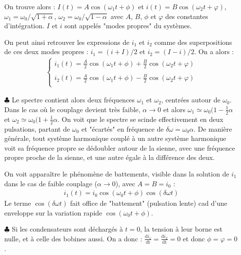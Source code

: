 \documentclass{report}
\begin{document}
\begin{itemize}
	On trouve alors : $I(t)=A\cos(\omega_1t+\phi)$ et $i(t)=B\cos(\omega_2t+\varphi)$, $\omega_1=\omega_0/\sqrt{1+\alpha}$, $\omega_2=\omega_0/\sqrt{1-\alpha}$ avec $A$, $B$, $\phi$ et $\varphi$ des constantes d'intégration. $I$ et $i$ sont appelés "modes propres" du systèmes.
	
	On peut ainsi retrouver les expressions de $i_1$ et $i_2$ comme des superpositions de ces deux modes propres : $i_1=(i+I)/2$ et $i_2=(I-i)/2$. On a alors :
		\begin{align*}
	\left\lbrace
	\begin{array}{ccc}
	i_1(t)=\frac{A}{2}\cos(\omega_1t+\phi)+\frac{B}{2}\cos(\omega_2t+\varphi)\\
	\\
	i_2(t)=\frac{A}{2}\cos(\omega_1t+\phi)-\frac{B}{2}\cos(\omega_2t+\varphi)\\
	\end{array}\right.
	\end{align*}		
	
	\item[$\clubsuit$] Le spectre contient alors deux fréquences $\omega_1$ et $\omega_2$, centrées autour de $\omega_0$. Dans le cas où le couplage devient très faible, $\alpha\longrightarrow0$ et alors $\omega_1\simeq\omega_0(1-\frac{1}{2}\alpha$ et $\omega_2\simeq\omega_0(1+\frac{1}{2}\alpha$. On voit que le spectre se scinde effectivement en deux pulsations, partant de $\omega_0$ et "écartés" en fréquence de $\delta\omega=\omega_0\alpha$. De manière générale, tout système harmonique couplé à un autre système harmonique voit sa fréquence propre se dédoubler autour de la sienne, avec une fréquence propre proche de la sienne, et une autre égale à la différence des deux. 
	
	On voit apparaître le phénomène de battements, visible dans la solution de $i_1$ dans le cas de faible couplage ($\alpha\longrightarrow0$), avec $A=B=i_0$ :
	\begin{align*}
		i_1(t)=i_0\cos(\omega_0t+\phi)\cos(\delta\omega t)
	\end{align*}
	Le terme $\cos(\delta\omega t)$ fait office de "battement" (pulsation lente) cad d'une enveloppe sur la variation rapide $\cos(\omega_0t+\phi)$.
	
	\item[$\clubsuit$] Si les condensateurs sont déchargés à $t=0$, la tension à leur borne est nulle, et à celle des bobines aussi. On a donc : $\frac{\mathrm{d}i_1}{\mathrm{dt}}=\frac{\mathrm{d}i_2}{\mathrm{dt}}=0$ et donc $\phi=\varphi=0$.
	

\end{itemize}
\end{document}
